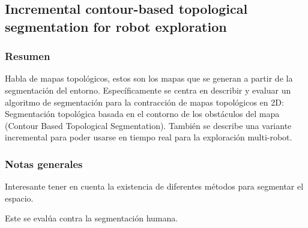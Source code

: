     




\subsection[Incremental contour-based topological segmentation for robot exploration]{Incremental contour-based topological\\ segmentation for robot exploration}
\subsubsection{Resumen}
Habla de mapas topológicos, estos son los mapas que se generan a partir de la segmentación del entorno. 
Específicamente se centra en describir y evaluar un algoritmo de segmentación para la contracción de mapas topológicos en 2D: Segmentación topológica basada en el contorno de los obstáculos del mapa (Contour Based Topological Segmentation).
También se describe una variante incremental para poder usarse en tiempo real para la exploración multi-robot.

\subsubsection{Notas generales}
Interesante tener en cuenta la existencia de diferentes métodos para segmentar el espacio.

Este se evalúa contra la segmentación humana.

